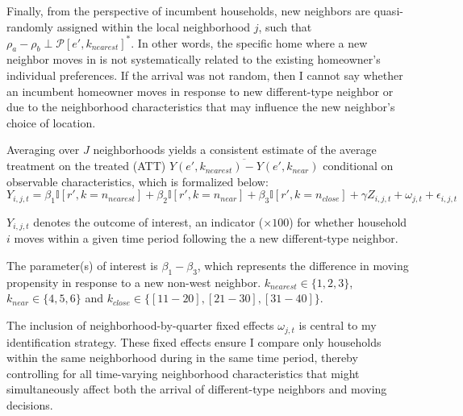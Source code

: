 \documentclass[../main.tex]{subfiles}
\begin{document}
Finally, from the perspective of incumbent households, new neighbors are quasi-randomly assigned within the local neighborhood $j$, such that $\rho_a - \rho_b \perp \mathcal{P}[e', k_{nearest}]^*$. In other words, the specific home where a new neighbor moves in is not systematically related to the existing homeowner's individual preferences. If the arrival was not random, then I cannot say whether an incumbent homeowner moves in response to new different-type neighbor or due to the neighborhood characteristics that may influence the new neighbor's choice of location. 

Averaging over $J$ neighborhoods yields a consistent estimate of the average treatment on the treated (ATT) $\overline{Y(e', k_{nearest}) - Y(e', k_{near})}$ conditional on observable characteristics, which is formalized below: 
\begin{equation}
    Y_{i, j, t} = \beta_1 \mathbb{I}[r', k=n_{nearest}] + \beta_2 \mathbb{I}[r', k = n_{near}] + \beta_3 \mathbb{I}[r', k = n_{close}]  + \gamma Z_{i, j, t} + \omega_{j, t} + \epsilon_{i, j, t}
    \label{eq:main_eq_schelling_behavior}
\end{equation}

$Y_{i, j, t}$ denotes the outcome of interest, an indicator ($\times100$) for whether household $i$ moves within a given time period following the a new different-type neighbor. 

The parameter(s) of interest is $\beta_1 - \beta_3$, which represents the difference in moving propensity in response to a new non-west neighbor. $k_{nearest} \in \{1, 2, 3\}$, $k_{near} \in \{4, 5, 6\}$ and $k_{close} \in \{[11-20], [21-30], [31-40]\}$.

The inclusion of neighborhood-by-quarter fixed effects $\omega_{j,t}$ is central to my identification strategy. These fixed effects ensure I compare only households within the same neighborhood during in the same time period, thereby controlling for all time-varying neighborhood characteristics that might simultaneously affect both the arrival of different-type neighbors and moving decisions. 
\end{document}
